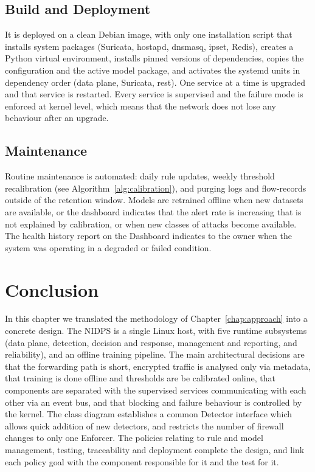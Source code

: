 \subsection{Build and Deployment}\label{sec:6.6.8}
\noindent It is deployed on a clean Debian image, with only one installation script that installs system packages (Suricata, hostapd, dnsmasq, ipset, Redis), creates a Python virtual environment, installs pinned versions of dependencies, copies the configuration and the active model package, and activates the systemd units in dependency order (data plane, Suricata, rest). One service at a time is upgraded and that service is restarted. Every service is supervised and the failure mode is enforced at kernel level, which means that the network does not lose any behaviour after an upgrade.

\subsection{Maintenance}\label{sec:6.6.9}
\noindent Routine maintenance is automated: daily rule updates, weekly threshold recalibration (see Algorithm~\ref{alg:calibration}), and purging logs and flow-records outside of the retention window. Models are retrained offline when new datasets are available, or the dashboard indicates that the alert rate is increasing that is not explained by calibration, or when new classes of attacks become available. The health history report on the Dashboard indicates to the owner when the system was operating in a degraded or failed condition.

\section{Conclusion}\label{sec:6.7}
\label{sec:ch6conclusion}
\noindent In this chapter we translated the methodology of Chapter~\ref{chap:approach} into a concrete design. The NIDPS is a single Linux host, with five runtime subsystems (data plane, detection, decision and response, management and reporting, and reliability), and an offline training pipeline. The main architectural decisions are that the forwarding path is short, encrypted traffic is analysed only via metadata, that training is done offline and thresholds are be calibrated online, that components are separated with the supervised services communicating with each other via an event bus, and that blocking and failure behaviour is controlled by the kernel. The class diagram establishes a common Detector interface which allows quick addition of new detectors, and restricts the number of firewall changes to only one Enforcer. The policies relating to rule and model management, testing, traceability and deployment complete the design, and link each policy goal with the component responsible for it and the test for it.
